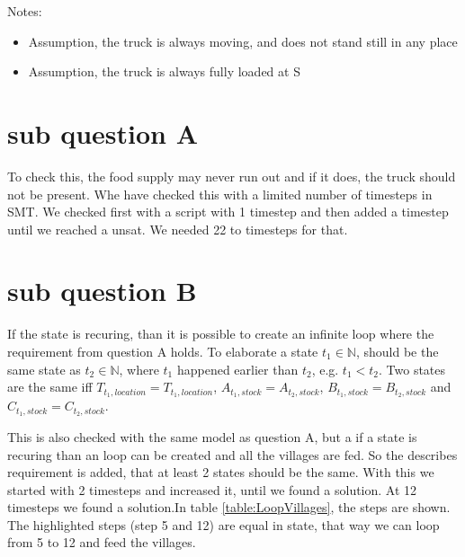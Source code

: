 Notes:
\begin{itemize}
\item Assumption, the truck is always moving, and does not stand still in any place \\
\item Assumption, the truck is always fully loaded at S
\end{itemize}

\section{sub question A}
To check this, the food supply may never run out and if it does, the truck should not be present. Whe have checked this with a limited number of timesteps in SMT. We checked first with a script with 1 timestep and then added a timestep until we reached a unsat. We needed 22 to timesteps for that.


\section{sub question B}
If the state is recuring, than it is possible to create an infinite loop where the requirement from question A holds. To elaborate a state $t_1 \in \mathbb{N}$, should be the same state as $t_2 \in \mathbb{N}$, where $t_1$ happened earlier than $t_2$, e.g. $t_1 < t_2$. Two states are the same iff $T_{t_1,location} = T_{t_1,location}$, $A_{t_1,stock} = A_{t_2,stock}$, $B_{t_1,stock} = B_{t_2,stock}$ and $C_{t_1,stock} = C_{t_2,stock}$.

This is also checked with the same model as question A, but a if a state is recuring than an loop can be created and all the villages are fed. So the describes requirement is added, that at least 2 states should be the same. With this we started with 2 timesteps and increased it, until we found a solution. At 12 timesteps we found a solution.In table \ref{table:LoopVillages}, the steps are shown. The highlighted steps (step 5 and 12) are equal in state, that way we can loop from 5 to 12 and feed the villages.

